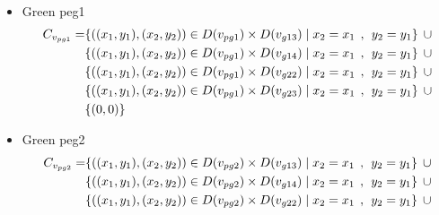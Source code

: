 \begin{appendices}
\begin{itemize}
\begin{align*}
\end{align*}
  \item Green peg1\\
  \begin{align*}
C_{v_{pg1}} = &\{((x_{1},y_{1}),(x_{2},y_{2}))\in D(v_{pg1}) \times D(v_{g13})\mid x_{2} = x_{1} \hspace{1ex} , \hspace{1ex}  y_{2} = y_{1}\} \hspace{1ex} \cup 
\\& \{((x_{1},y_{1}),(x_{2},y_{2}))\in D(v_{pg1}) \times D(v_{g14})\mid x_{2} = x_{1} \hspace{1ex} , \hspace{1ex}  y_{2} = y_{1}\} \hspace{1ex} \cup 
\\&\{ ((x_{1},y_{1}),(x_{2},y_{2}))\in D(v_{pg1}) \times D(v_{g22})\mid x_{2} = x_{1} \hspace{1ex} , \hspace{1ex}  y_{2} = y_{1}\}\hspace{1ex} \cup 
\\&\{ ((x_{1},y_{1}),(x_{2},y_{2}))\in D(v_{pg1}) \times D(v_{g23})\mid x_{2} = x_{1} \hspace{1ex} , \hspace{1ex}  y_{2} = y_{1}\} \hspace{1ex} \cup 
\\&\{(0,0)\}
\end{align*}
  \item Green peg2\\
  \begin{align*}
\Constraint{pg2} = &\{((x_{1},y_{1}),(x_{2},y_{2}))\in \Domain{pg2} \times \Domain{g13}\mid x_{2} = x_{1} \hspace{1ex} , \hspace{1ex}  y_{2} = y_{1}\} \hspace{1ex} \cup 
\\&\{((x_{1},y_{1}),(x_{2},y_{2}))\in \Domain{pg2} \times \Domain{g14}\mid x_{2} = x_{1} \hspace{1ex} , \hspace{1ex}  y_{2} = y_{1}\} \hspace{1ex} \cup 
\\&\{ ((x_{1},y_{1}),(x_{2},y_{2}))\in \Domain{pg2} \times \Domain{g22}\mid x_{2} = x_{1} \hspace{1ex} , \hspace{1ex}  y_{2} = y_{1}\}\hspace{1ex} \cup 

\end{align*}
\end{itemize}
\end{appendices}
